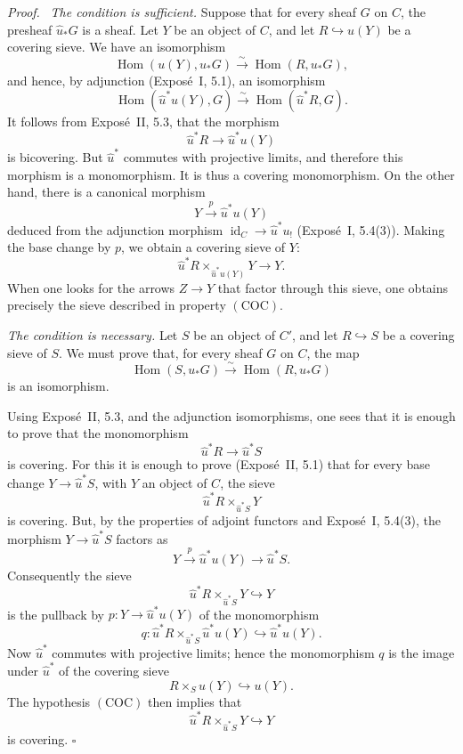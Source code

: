 \documentclass[11pt]{article}
\newcommand{\Hom}{\operatorname{Hom}}
\newcommand{\id}{\operatorname{id}}
\newcommand{\qedtext}{\hfill\(\square\)}
\newenvironment{prooftext}{\par\noindent\emph{Proof.}\ }{\par\medskip}
\begin{document}
\begin{prooftext}
\emph{The condition is sufficient.} Suppose that for every sheaf \(G\) on \(C\), the presheaf \(\widehat u_*G\) is a sheaf. Let \(Y\) be an object of \(C\), and let \(R\hookrightarrow u(Y)\) be a covering sieve. We have an isomorphism
\[
\Hom(u(Y),u_*G)\xrightarrow{\sim}\Hom(R,u_*G),
\]
and hence, by adjunction (Expos\'e~I, 5.1), an isomorphism
\[
\Hom(\widehat u^*u(Y),G)\xrightarrow{\sim}\Hom(\widehat u^*R,G).
\]
It follows from Expos\'e~II, 5.3, that the morphism
\[
\widehat u^*R\longrightarrow\widehat u^*u(Y)
\]
is bicovering. But \(\widehat u^*\) commutes with projective limits, and therefore this morphism is a monomorphism. It is thus a covering monomorphism. On the other hand, there is a canonical morphism
\[
Y\xrightarrow{p}\widehat u^*u(Y)
\]
deduced from the adjunction morphism \(\id_C\to\widehat u^*u_!\) (Expos\'e~I, 5.4(3)). Making the base change by \(p\), we obtain a covering sieve of \(Y\):
\[
\widehat u^*R\times_{\widehat u^*u(Y)}Y\longrightarrow Y.
\]
When one looks for the arrows \(Z\to Y\) that factor through this sieve, one obtains precisely the sieve described in property \((\mathrm{COC})\).

\medskip
\noindent\emph{The condition is necessary.} Let \(S\) be an object of \(C'\), and let \(R\hookrightarrow S\) be a covering sieve of \(S\). We must prove that, for every sheaf \(G\) on \(C\), the map
\[
\Hom(S,u_*G)\xrightarrow{\sim}\Hom(R,u_*G)
\]
is an isomorphism.

Using Expos\'e~II, 5.3, and the adjunction isomorphisms, one sees that it is enough to prove that the monomorphism
\[
\widehat u^*R\longrightarrow\widehat u^*S
\]
is covering. For this it is enough to prove (Expos\'e~II, 5.1) that for every base change \(Y\to\widehat u^*S\), with \(Y\) an object of \(C\), the sieve
\[
\widehat u^*R\times_{\widehat u^*S}Y
\]
is covering. But, by the properties of adjoint functors and Expos\'e~I, 5.4(3), the morphism \(Y\to\widehat u^*S\) factors as
\[
Y\xrightarrow{p}\widehat u^*u(Y)\longrightarrow\widehat u^*S.
\]
Consequently the sieve
\[
\widehat u^*R\times_{\widehat u^*S}Y\hookrightarrow Y
\]
is the pullback by \(p:Y\to\widehat u^*u(Y)\) of the monomorphism
\[
q:\widehat u^*R\times_{\widehat u^*S}\widehat u^*u(Y)
\hookrightarrow\widehat u^*u(Y).
\]
Now \(\widehat u^*\) commutes with projective limits; hence the monomorphism \(q\) is the image under \(\widehat u^*\) of the covering sieve
\[
R\times_Su(Y)\hookrightarrow u(Y).
\]
The hypothesis \((\mathrm{COC})\) then implies that
\[
\widehat u^*R\times_{\widehat u^*S}Y\hookrightarrow Y
\]
is covering. \qedtext
\end{prooftext}
\end{document}
